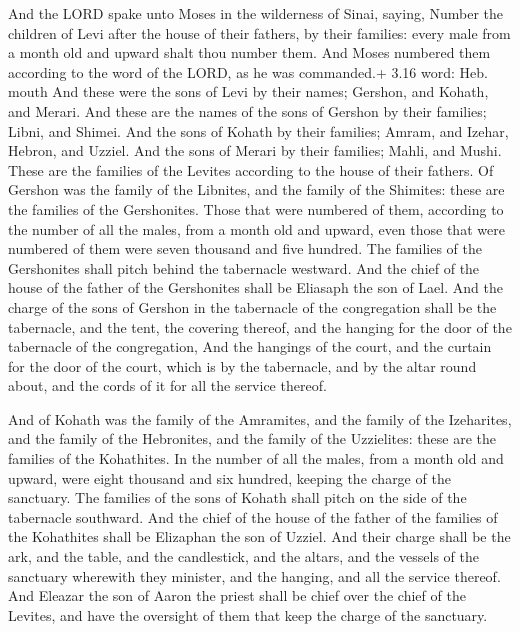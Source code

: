  And the LORD spake unto Moses in the wilderness of
Sinai, saying,  Number the children of Levi after the house
of their fathers, by their families: every male from a month old and
upward shalt thou number them.  And Moses numbered them
according to the word of the LORD, as he was commanded.+ 3.16 word: Heb.
mouth  And these were the sons of Levi by their names;
Gershon, and Kohath, and Merari.  And these are the names
of the sons of Gershon by their families; Libni, and Shimei.
 And the sons of Kohath by their families; Amram, and
Izehar, Hebron, and Uzziel.  And the sons of Merari by
their families; Mahli, and Mushi. These are the families of the Levites
according to the house of their fathers.  Of Gershon was
the family of the Libnites, and the family of the Shimites: these are
the families of the Gershonites.  Those that were numbered
of them, according to the number of all the males, from a month old and
upward, even those that were numbered of them were seven thousand and
five hundred.  The families of the Gershonites shall pitch
behind the tabernacle westward.  And the chief of the house
of the father of the Gershonites shall be Eliasaph the son of Lael.
 And the charge of the sons of Gershon in the tabernacle of
the congregation shall be the tabernacle, and the tent, the covering
thereof, and the hanging for the door of the tabernacle of the
congregation,  And the hangings of the court, and the
curtain for the door of the court, which is by the tabernacle, and by
the altar round about, and the cords of it for all the service thereof.

 And of Kohath was the family of the Amramites, and the
family of the Izeharites, and the family of the Hebronites, and the
family of the Uzzielites: these are the families of the Kohathites.
 In the number of all the males, from a month old and
upward, were eight thousand and six hundred, keeping the charge of the
sanctuary.  The families of the sons of Kohath shall pitch
on the side of the tabernacle southward.  And the chief of
the house of the father of the families of the Kohathites shall be
Elizaphan the son of Uzziel.  And their charge shall be the
ark, and the table, and the candlestick, and the altars, and the vessels
of the sanctuary wherewith they minister, and the hanging, and all the
service thereof.  And Eleazar the son of Aaron the priest
shall be chief over the chief of the Levites, and have the oversight of
them that keep the charge of the sanctuary.

